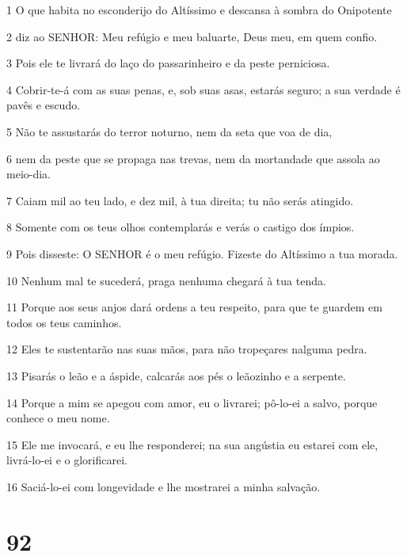 \par 1 O que habita no esconderijo do Altíssimo e descansa à sombra do Onipotente
\par 2 diz ao SENHOR: Meu refúgio e meu baluarte, Deus meu, em quem confio.
\par 3 Pois ele te livrará do laço do passarinheiro e da peste perniciosa.
\par 4 Cobrir-te-á com as suas penas, e, sob suas asas, estarás seguro; a sua verdade é pavês e escudo.
\par 5 Não te assustarás do terror noturno, nem da seta que voa de dia,
\par 6 nem da peste que se propaga nas trevas, nem da mortandade que assola ao meio-dia.
\par 7 Caiam mil ao teu lado, e dez mil, à tua direita; tu não serás atingido.
\par 8 Somente com os teus olhos contemplarás e verás o castigo dos ímpios.
\par 9 Pois disseste: O SENHOR é o meu refúgio. Fizeste do Altíssimo a tua morada.
\par 10 Nenhum mal te sucederá, praga nenhuma chegará à tua tenda.
\par 11 Porque aos seus anjos dará ordens a teu respeito, para que te guardem em todos os teus caminhos.
\par 12 Eles te sustentarão nas suas mãos, para não tropeçares nalguma pedra.
\par 13 Pisarás o leão e a áspide, calcarás aos pés o leãozinho e a serpente.
\par 14 Porque a mim se apegou com amor, eu o livrarei; pô-lo-ei a salvo, porque conhece o meu nome.
\par 15 Ele me invocará, e eu lhe responderei; na sua angústia eu estarei com ele, livrá-lo-ei e o glorificarei.
\par 16 Saciá-lo-ei com longevidade e lhe mostrarei a minha salvação.

\chapter{92}

